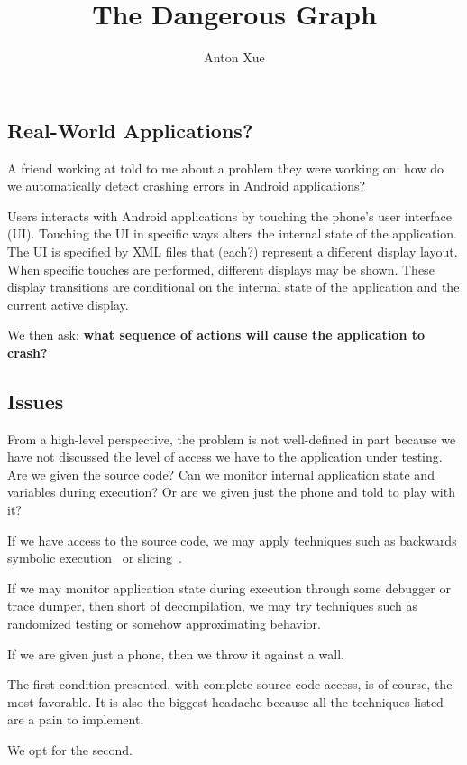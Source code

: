 \documentclass[12pt]{article}
\title{The Dangerous Graph}
\author{Anton Xue}
\date{}
\let\company\undefined
\newcommand{\company}{\textbf{Big Tech Company}}
\newcommand{\android}{Android}
\begin{document}
\maketitle

\subsection{Real-World Applications?}

A friend working at \company{} told to me about a problem
they were working on:
how do we automatically detect crashing errors in \android{} applications?

Users interacts with \android{} applications by touching
the phone's user interface (UI).
Touching the UI in specific ways alters the internal state of the application.
The UI is specified by XML files that (each?) represent a
different display layout.
When specific touches are performed, different displays may be shown.
These display transitions are conditional on the internal state of the
application and the current active display.

We then ask:
\textbf{what sequence of actions will cause the application to crash?}


\subsection{Issues}
From a high-level perspective, the problem is not well-defined in part
because we have not discussed the level of access we have to the
application under testing.
Are we given the source code?
Can we monitor internal application state and variables during execution?
Or are we given just the phone and told to play with it?

If we have access to the source code, we may apply techniques such as
backwards symbolic execution~\cite{baldoni-backwards} or
slicing~\cite{weiser-slicing}.

If we may monitor application state during execution through some debugger
or trace dumper, then short of decompilation, we may try techniques such
as randomized testing or somehow approximating behavior.

If we are given just a phone, then we throw it against a wall.

The first condition presented, with complete source code access, is of
course, the most favorable.
It is also the biggest headache because all the techniques listed are
a pain to implement.

We opt for the second.
\end{document}
